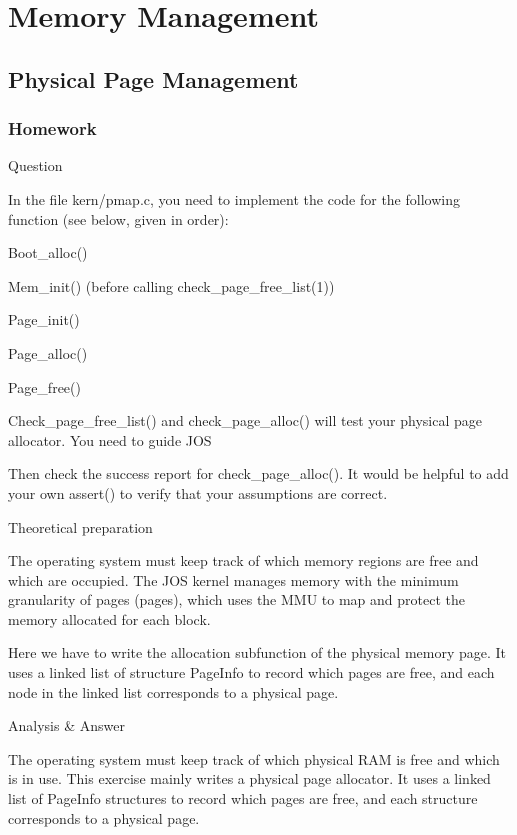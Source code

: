 
\section{Memory Management}
\subsection{Physical Page Management}
\subsubsection{Homework }
\begin{flushleft}
{\Large Question}
\end{flushleft}

In the file kern/pmap.c, you need to implement the code for the following function (see below, given in order):

Boot\_alloc()

Mem\_init() (before calling check\_page\_free\_list(1))

Page\_init()

Page\_alloc()

Page\_free()

Check\_page\_free\_list() and check\_page\_alloc() will test your physical page allocator. You need to guide JOS

Then check the success report for check\_page\_alloc(). It would be helpful to add your own assert() to verify that your assumptions are correct.
\begin{flushleft}
{\Large Theoretical preparation}
\end{flushleft}


The operating system must keep track of which memory regions are free and which are occupied. The JOS kernel manages memory with the minimum granularity of pages (pages), which uses the MMU to map and protect the memory allocated for each block.

Here we have to write the allocation subfunction of the physical memory page. It uses a linked list of structure PageInfo to record which pages are free, and each node in the linked list corresponds to a physical page.

\begin{flushleft}
{\Large Analysis \& Answer}
\end{flushleft}

The operating system must keep track of which physical RAM is free and which is in use. This exercise mainly writes a physical page allocator. It uses a linked list of PageInfo structures to record which pages are free, and each structure corresponds to a physical page.

